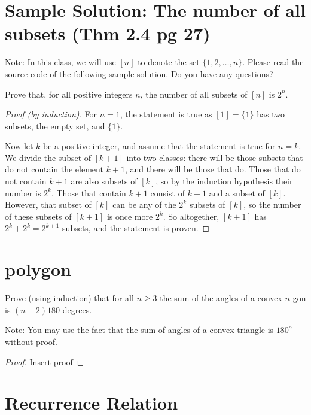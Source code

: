 \documentclass[11pt]{amsart}
\begin{document}
\section*{Sample Solution: The number of all subsets (Thm 2.4 pg 27)}

Note: In this class, we will use $[n]$ to denote the set $\{1,2,\dots,n \}$.
Please read the source code of the following sample solution. Do you have any questions?


\smallskip


\noindent 
Prove that, for all positive integers $n$, the number of all subsets of $[n]$ is $2^n$.

\begin{proof}[Proof (by induction)]
For $n=1$, the statement is true as $[1]=\{1\}$ has two subsets, the empty set, and $\{1\}$.
	
Now let $k$ be a positive integer, and assume that the statement is true for $n=k$. We divide the subset of $[k+1]$ into two classes: there will be those subsets that do not contain the element $k+1$, and there will be those that do. Those that do not contain $k+1$ are also subsets of $[k]$, so by the induction hypothesis their number is $2^k$. Those that contain $k+1$ consist of $k+1$ and a subset of $[k]$. However, that subset of $[k]$ can be any of the $2^k$ subsets of $[k]$, so the number of these subsets of $[k+1]$ is once more $2^k$. So altogether, $[k+1]$ has $2^k + 2^k = 2^{k+1}$ subsets, and the statement is proven. 
\end{proof}


\section{polygon}
Prove (using induction) that for all $n \ge 3$ the sum of the angles of a convex $n$-gon is $(n-2)180$ degrees.

Note: You may use the fact that the sum of angles of a convex triangle is $180^o$ without proof.
\begin{proof}
	Insert proof
\end{proof}




\section{Recurrence Relation}
\end{document}
